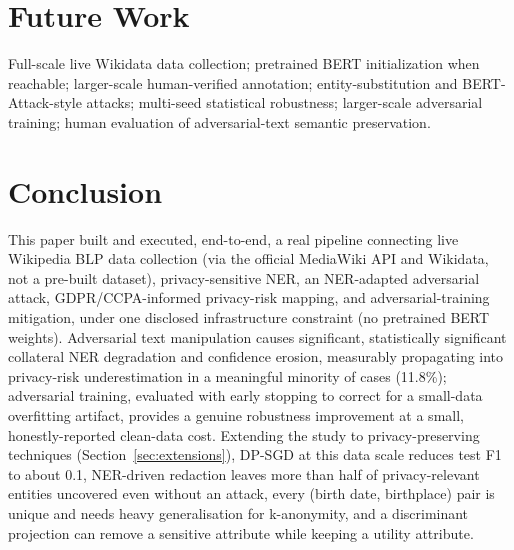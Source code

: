 \documentclass[conference]{IEEEtran}
\begin{document}
\section{Future Work}
Full-scale live Wikidata data collection; pretrained BERT initialization when reachable; larger-scale human-verified annotation; entity-substitution and BERT-Attack-style attacks; multi-seed statistical robustness; larger-scale adversarial training; human evaluation of adversarial-text semantic preservation.

\section{Conclusion}
This paper built and executed, end-to-end, a real pipeline connecting live Wikipedia BLP data collection (via the official MediaWiki API and Wikidata, not a pre-built dataset), privacy-sensitive NER, an NER-adapted adversarial attack, GDPR/CCPA-informed privacy-risk mapping, and adversarial-training mitigation, under one disclosed infrastructure constraint (no pretrained BERT weights). Adversarial text manipulation causes significant, statistically significant collateral NER degradation and confidence erosion, measurably propagating into privacy-risk underestimation in a meaningful minority of cases (11.8\%); adversarial training, evaluated with early stopping to correct for a small-data overfitting artifact, provides a genuine robustness improvement at a small, honestly-reported clean-data cost. Extending the study to privacy-preserving techniques (Section~\ref{sec:extensions}), DP-SGD at this data scale reduces test F1 to about 0.1, NER-driven redaction leaves more than half of privacy-relevant entities uncovered even without an attack, every (birth date, birthplace) pair is unique and needs heavy generalisation for k-anonymity, and a discriminant projection can remove a sensitive attribute while keeping a utility attribute.



\end{document}
